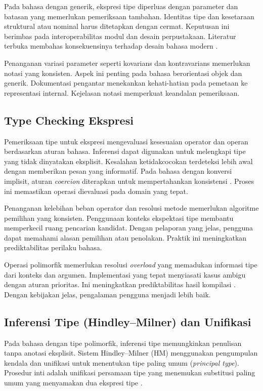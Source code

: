 \documentclass[../main.tex]{subfiles}
\begin{document}
Pada bahasa dengan generik, ekspresi tipe diperluas dengan parameter dan batasan yang memerlukan pemeriksaan tambahan. Identitas tipe dan kesetaraan struktural atau nominal harus ditetapkan dengan cermat. Keputusan ini berimbas pada interoperabilitas modul dan desain perpustakaan. Literatur terbuka membahas konsekuensinya terhadap desain bahasa modern \citep{WikiTypeSystem}.

Penanganan variasi parameter seperti kovarians dan kontravarians memerlukan notasi yang konsisten. Aspek ini penting pada bahasa berorientasi objek dan generik. Dokumentasi pengantar menekankan kehati-hatian pada pemetaan ke representasi internal. Kejelasan notasi memperkuat keandalan pemeriksaan.

\subsection{Type Checking Ekspresi}
Pemeriksaan tipe untuk ekspresi mengevaluasi kesesuaian operator dan operan berdasarkan aturan bahasa. Inferensi dapat digunakan untuk melengkapi tipe yang tidak dinyatakan eksplisit. Kesalahan ketidakcocokan terdeteksi lebih awal dengan memberikan pesan yang informatif. Pada bahasa dengan konversi implisit, aturan \emph{coercion} diterapkan untuk mempertahankan konsistensi \citep{WikiTypeChecking,WikiCoercion}. Proses ini memastikan operasi dievaluasi pada domain yang tepat.

Penanganan kelebihan beban operator dan resolusi metode memerlukan algoritme pemilihan yang konsisten. Penggunaan konteks ekspektasi tipe membantu memperkecil ruang pencarian kandidat. Dengan pelaporan yang jelas, pengguna dapat memahami alasan pemilihan atau penolakan. Praktik ini meningkatkan prediktabilitas perilaku bahasa.

Operasi polimorfik memerlukan resolusi \emph{overload} yang memadukan informasi tipe dari konteks dan argumen. Implementasi yang tepat menyiasati kasus ambigu dengan aturan prioritas. Ini meningkatkan prediktabilitas hasil kompilasi \citep{WikiTypeChecking}. Dengan kebijakan jelas, pengalaman pengguna menjadi lebih baik.

\subsection{Inferensi Tipe (Hindley--Milner) dan Unifikasi}
Pada bahasa dengan tipe polimorfik, inferensi tipe memungkinkan penulisan tanpa anotasi eksplisit. Sistem Hindley--Milner (HM) menggunakan pengumpulan kendala dan unifikasi untuk menentukan tipe paling umum (\emph{principal type}). Prosedur inti adalah unifikasi persamaan tipe yang menemukan substitusi paling umum yang menyamakan dua ekspresi tipe \citep{WikiHindleyMilner,WikiTypeInference,WikiUnification}.
\end{document}
